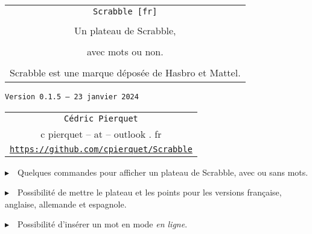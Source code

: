 \documentclass{article}
\def\TPversion{0.1.5}
\def\TPdate{23 janvier 2024}
\begin{document}
\pagestyle{fancy}

\thispagestyle{empty}

\vspace{2cm}

\begin{center}
	\begin{minipage}{0.75\linewidth}
	\begin{tcolorbox}[colframe=yellow,colback=yellow!15]
		\begin{center}
			\begin{tabular}{c}
				{\Huge \texttt{Scrabble [fr]}}\\
				\\
				{\LARGE Un plateau de Scrabble,} \\
				\\
				{\LARGE avec mots ou non.} \\
				\\
				{Scrabble\texttrademark{} est une marque déposée de Hasbro\texttrademark{} et Mattel\texttrademark{}.}
			\end{tabular}
			
			\medskip
			
			{\small \texttt{Version \TPversion{} -- \TPdate}}
		\end{center}
	\end{tcolorbox}
\end{minipage}
\end{center}

\vspace{0.5cm}

\begin{center}
	\begin{tabular}{c}
	\texttt{Cédric Pierquet}\\
	{\ttfamily c pierquet -- at -- outlook . fr}\\
	\texttt{\url{https://github.com/cpierquet/Scrabble}}
\end{tabular}
\end{center}

\vspace{0.5cm}

{$\blacktriangleright$~~Quelques commandes pour afficher un plateau de Scrabble, avec ou sans mots.}

\smallskip

{$\blacktriangleright$~~Possibilité de mettre le plateau et les points pour les versions française, anglaise, allemande et espagnole.}

\smallskip

{$\blacktriangleright$~~Possibilité d'insérer un mot en mode \textit{en ligne}.}
\end{document}
